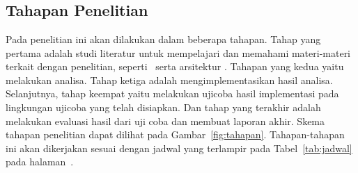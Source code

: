 \chapter{\babTiga}

\section{Tahapan Penelitian}

Pada penelitian ini akan dilakukan dalam beberapa tahapan. Tahap yang pertama
adalah studi literatur untuk mempelajari dan memahami materi-materi terkait
dengan penelitian, seperti \tracking~serta arsitektur \pubsub. Tahapan yang
kedua yaitu melakukan analisa. Tahap ketiga adalah mengimplementasikan hasil
analisa. Selanjutnya, tahap keempat yaitu melakukan ujicoba hasil implementasi
pada lingkungan ujicoba yang telah disiapkan. Dan tahap yang terakhir adalah
melakukan evaluasi hasil dari uji coba dan membuat laporan akhir. Skema tahapan
penelitian dapat dilihat pada Gambar~\ref{fig:tahapan}. Tahapan-tahapan ini
akan dikerjakan sesuai dengan jadwal yang terlampir pada Tabel~\ref{tab:jadwal}
pada halaman~\pageref{tab:jadwal}. 

